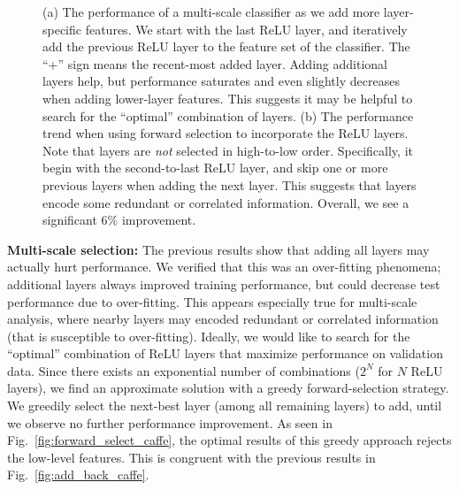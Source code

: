 \documentclass[10pt,twocolumn,letterpaper]{article}
\begin{document}
\begin{figure}[t!]
\centering
\caption{ (a) The performance of a multi-scale classifier as we add more layer-specific features. We start with the last ReLU layer, and iteratively add the previous ReLU layer to the feature set of the classifier.
The ``+'' sign means the recent-most added layer. Adding additional layers help, but performance saturates and even slightly decreases when adding lower-layer features. This suggests it may be helpful to search for the ``optimal'' combination of layers. (b) The performance trend when using forward selection to incorporate the ReLU layers. Note that layers are {\em not} selected in high-to-low order. Specifically, it begin with the second-to-last ReLU layer, and skip one or more previous layers when adding the next layer. This suggests that layers encode some redundant or correlated information. Overall, we see a significant 6\% improvement.}
\label{fig:add_back}
\end{figure}

{\bf Multi-scale selection:} The previous results show that adding all layers may actually hurt performance. We verified that this was an over-fitting phenomena; additional layers always improved training performance, but could decrease test performance due to over-fitting. This appears especially true for multi-scale analysis, where nearby layers may encoded redundant or correlated information (that is susceptible to over-fitting). Ideally, we would like to search for the ``optimal'' combination of ReLU layers that maximize performance on validation data. Since there exists an exponential number of combinations ($2^N$ for $N$ ReLU layers), we find an approximate solution with a greedy forward-selection strategy. We greedily select the next-best layer (among all remaining layers) to add, until we observe no further performance improvement. As seen in Fig.~\ref{fig:forward_select_caffe}, the optimal results of this greedy approach rejects the low-level features. This is congruent with the previous results in Fig.~\ref{fig:add_back_caffe}. 
\end{document}
